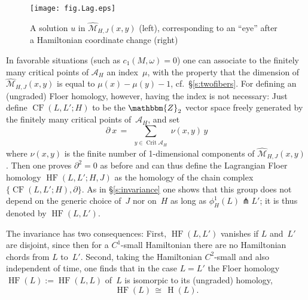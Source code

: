 \documentclass[12pt,twoside]{amsart}
\theoremstyle{plain}
\numberwithin{figure}{section}
\numberwithin{equation}{section}
\def\1{\:\!}
\def\Crit{\operatorname{Crit}}
\def\H{\operatorname{H}}
\def\CF{\operatorname{CF}}
\def\HF{\operatorname{HF}}
\def\ca{{\mathcal A}}
\def\cm{{\mathcal M}}
\def\ZZ{\mathbbm{Z}}
\def\pp{\partial}
\begin{document}
%
\begin{figure}[h]   
 \begin{center} 
  \psfrag{na}{\footnotesize $-\nabla \ca_H$}
  \psfrag{F'}{\footnotesize $\overline \pp u =0$}
  \psfrag{F}{\footnotesize $\overline \pp u = J X_H$}
  \leavevmode\texttt{[image: fig.Lag.eps]}
 \end{center}
 \caption{A solution $u$ in $\widehat \cm_{H,J}(x,y)$ (left), corresponding to  an ``eye'' after a Hamiltonian coordinate change (right)}
 \label{fig.Lag}
\end{figure}
%
 

In favorable situations (such as $c_1(M,\omega) =0$)
one can associate to the finitely many critical points of $\ca_H$ an index~$\mu$, 
with the property that the dimension of $\widehat \cm_{H,J} (x,y)$ is equal to $\mu(x)-\mu(y)-1$,
cf.\ \S \ref{s:twofibers}.
For defining an (ungraded) Floer homology, however, having the index is not necessary:
Just define $\CF (L,L';H)$ to be the $\ZZ_2$ vector space freely generated by the finitely many 
critical points of~$\ca_H$, and set
$$
\partial \1  x \,=\, \sum_{\substack{y \in \Crit \ca_H}} \nu (x,y)\, y
$$
where $\nu (x,y)$ is the finite number of 1-dimensional components of $\widehat \cm_{H,J}(x,y)$.
Then one proves $\pp^2 =0$ as before and can thus define the Lagrangian Floer homology $\HF (L,L';H,J)$
as the homology of the chain complex $\{ \CF (L,L';H), \pp \}$.
As in \S \ref{s:invariance} one shows that this group does not depend on the generic choice of~$J$
nor on~$H$ as long as $\phi_H^1(L) \pitchfork L'$; it is thus denoted by $\HF (L,L')$.

The invariance has two consequences:
First, $\HF (L,L')$ vanishes if $L$ and~$L'$ are disjoint, since then for a $C^1$-small Hamiltonian
there are no Hamiltonian chords from $L$ to~$L'$.
Second, taking the Hamiltonian $C^2$-small and also independent of time, 
one finds that in the case $L=L'$ the Floer homology $\HF (L) :=\HF (L,L)$ of~$L$
is isomorpic to its (ungraded) homology,
\begin{equation} \label{iso:HL}
\HF (L) \,\cong\, \H (L) .
\end{equation}
\end{document}
